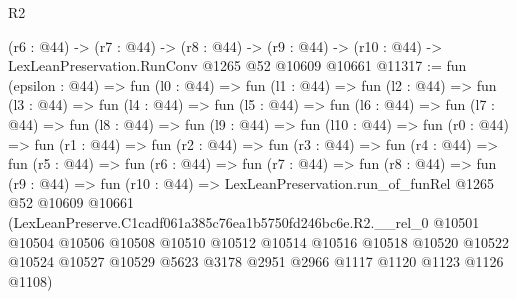 \begin{lexlean}{R2}
\begin{coremodule}
  (r6 : @44) ->
  (r7 : @44) ->
  (r8 : @44) -> (r9 : @44) -> (r10 : @44) -> LexLeanPreservation.RunConv @1265 @52 @10609 @10661
@11317 := fun (epsilon : @44) =>
  fun (l0 : @44) =>
  fun (l1 : @44) =>
  fun (l2 : @44) =>
  fun (l3 : @44) =>
  fun (l4 : @44) =>
  fun (l5 : @44) =>
  fun (l6 : @44) =>
  fun (l7 : @44) =>
  fun (l8 : @44) =>
  fun (l9 : @44) =>
  fun (l10 : @44) =>
  fun (r0 : @44) =>
  fun (r1 : @44) =>
  fun (r2 : @44) =>
  fun (r3 : @44) =>
  fun (r4 : @44) =>
  fun (r5 : @44) =>
  fun (r6 : @44) =>
  fun (r7 : @44) =>
  fun (r8 : @44) =>
  fun (r9 : @44) =>
  fun (r10 : @44) =>
  LexLeanPreservation.run_of_funRel
    @1265
    @52
    @10609
    @10661
    (LexLeanPreserve.C1cadf061a385c76ea1b5750fd246bc6e.R2.__rel_0
      @10501
      @10504
      @10506
      @10508
      @10510
      @10512
      @10514
      @10516
      @10518
      @10520
      @10522
      @10524
      @10527
      @10529
      @5623
      @3178
      @2951
      @2966
      @1117
      @1120
      @1123
      @1126
      @1108)
\end{coremodule}
\end{lexlean}
